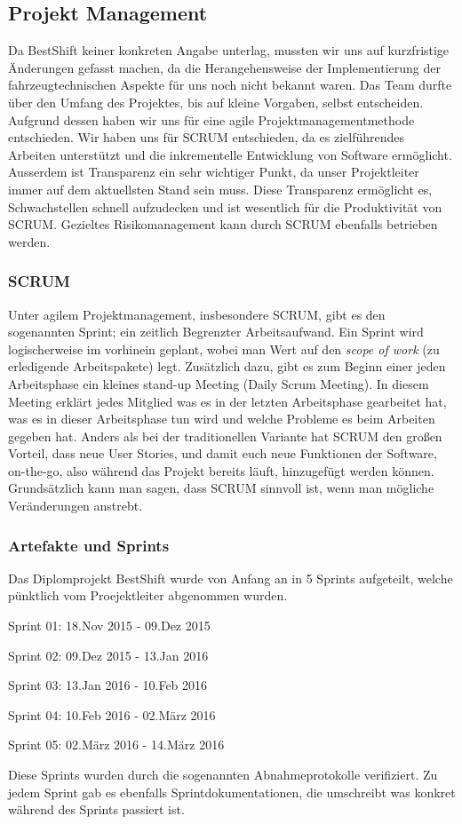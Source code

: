 \subsection{Projekt Management}

Da BestShift keiner konkreten Angabe unterlag,
mussten wir uns auf kurzfristige Änderungen gefasst machen, da die Herangehensweise der Implementierung der fahrzeugtechnischen Aspekte für uns noch nicht bekannt waren.
Das Team durfte über den Umfang des Projektes, bis auf kleine Vorgaben, selbst entscheiden.
Aufgrund dessen haben wir uns für eine agile Projektmanagementmethode entschieden. 
Wir haben uns für SCRUM entschieden, da es zielführendes Arbeiten unterstützt und die inkrementelle Entwicklung von Software ermöglicht. 
Ausserdem ist Transparenz ein sehr wichtiger Punkt, da unser Projektleiter immer auf dem aktuellsten Stand sein muss. Diese Transparenz ermöglicht es, Schwachstellen schnell aufzudecken und ist wesentlich für die Produktivität von SCRUM.
Gezieltes Risikomanagement kann durch SCRUM ebenfalls betrieben werden. 

\subsubsection{SCRUM}
Unter agilem Projektmanagement, insbesondere SCRUM, gibt es den sogenannten
Sprint; ein zeitlich Begrenzter Arbeitsaufwand. Ein Sprint wird logischerweise im vorhinein geplant, wobei man Wert auf den \textit{scope of work} (zu erledigende Arbeitspakete) legt. 
Zusätzlich dazu, gibt es zum Beginn einer jeden
Arbeitsphase ein kleines stand-up Meeting (Daily Scrum Meeting). In diesem Meeting erklärt jedes Mitglied was es in der letzten Arbeitsphase gearbeitet hat, was es in dieser Arbeitsphase tun wird und welche Probleme es beim Arbeiten gegeben hat.
Anders als bei der traditionellen Variante hat SCRUM den großen Vorteil, dass neue User Stories, und damit euch neue Funktionen der Software, on-the-go, also während das Projekt bereits läuft, hinzugefügt werden können. Grundsätzlich kann man sagen, dass SCRUM sinnvoll ist, wenn man mögliche Veränderungen anstrebt.

\subsubsection{Artefakte und Sprints}
Das Diplomprojekt BestShift wurde von Anfang an in 5 Sprints aufgeteilt, welche pünktlich vom Proejektleiter abgenommen wurden.
\begin{description}
\item Sprint 01: 18.Nov 2015 - 09.Dez 2015
\item Sprint 02: 09.Dez 2015 - 13.Jan 2016
\item Sprint 03: 13.Jan 2016 - 10.Feb 2016
\item Sprint 04: 10.Feb 2016 - 02.März 2016
\item Sprint 05: 02.März 2016 - 14.März 2016
\end{description}

Diese Sprints wurden durch die sogenannten Abnahmeprotokolle verifiziert.
Zu jedem Sprint gab es ebenfalls Sprintdokumentationen, die umschreibt was konkret während des Sprints passiert ist.


\clearpage %